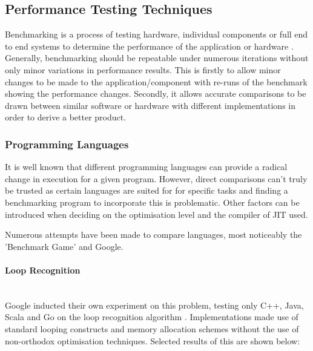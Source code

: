\documentclass[final_report.tex]{subfiles}
\begin{document}
\subsection{Performance Testing Techniques}
Benchmarking is a process of testing hardware, individual components or full end to end systems to determine the performance of the application or hardware . Generally, benchmarking should be repeatable under numerous iterations without only minor variations in performance results. This is firstly to allow minor changes to be made to the application/component with re-runs of the benchmark showing the performance changes. Secondly, it allows accurate comparisons to be drawn between similar software or hardware with different implementations in order to derive  a better product.


\subsubsection{Programming Languages}
It is well known that different programming languages can provide a radical change in execution for a given program. However, direct comparisons can't truly be trusted as certain languages are suited for for specific tasks and finding a benchmarking program to incorporate this is problematic. Other factors can be introduced when deciding on the optimisation level  and the compiler of JIT used. 

Numerous attempts have been made to compare languages, most noticeably the 'Benchmark Game' and Google. 
\paragraph{Loop Recognition}\mbox{}\\
Google inducted their own experiment on this problem, testing only C++, Java, Scala and Go on the loop recognition algorithm . Implementations made use of standard looping constructs and memory allocation schemes without the use of non-orthodox optimisation techniques. Selected results of this are shown below: 
\end{document}
